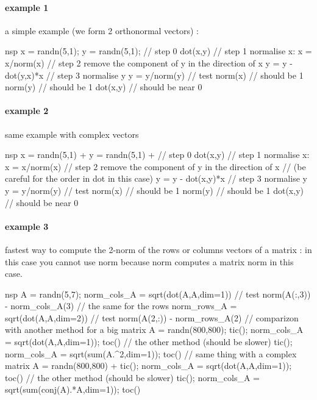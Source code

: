 \begin{examples}
\paragraph{example 1} a simple example (we form 2 orthonormal vectors) :
\begin{mintednsp}{nsp}
x = randn(5,1);
y = randn(5,1);
// step 0
dot(x,y)
// step 1 normalise x:
x = x/norm(x)
// step 2 remove the component of y in the direction of x
y = y - dot(y,x)*x
// step 3 normalise y
y = y/norm(y)
// test 
norm(x)  // should be 1
norm(y)  // should be 1
dot(x,y) // should be near 0
\end{mintednsp}

\paragraph{example 2} same example with complex vectors
\begin{mintednsp}{nsp}
x = randn(5,1) + %
y = randn(5,1) + %
// step 0
dot(x,y)
// step 1 normalise x:
x = x/norm(x)
// step 2 remove the component of y in the direction of x
// (be careful for the order in dot in this case)
y = y - dot(x,y)*x
// step 3 normalise y
y = y/norm(y)
// test 
norm(x)  // should be 1
norm(y)  // should be 1
dot(x,y) // should be near 0
\end{mintednsp}

\paragraph{example 3} fastest way to compute the 2-norm of the rows or
 columns vectors of a matrix : in this case you cannot use norm because
 norm computes a matrix norm in this case.
\begin{mintednsp}{nsp}
A = randn(5,7);
norm_cols_A = sqrt(dot(A,A,dim=1))
// test
norm(A(:,3)) - norm_cols_A(3)
// the same for the rows
norm_rows_A = sqrt(dot(A,A,dim=2))
// test
norm(A(2,:)) - norm_rows_A(2)
// comparizon with another method for a big matrix
A = randn(800,800);
tic(); norm_cols_A = sqrt(dot(A,A,dim=1)); toc()
// the other method (should be slower)
tic(); norm_cols_A = sqrt(sum(A.^2,dim=1)); toc()
// same thing with a complex matrix
A = randn(800,800) + %
tic(); norm_cols_A = sqrt(dot(A,A,dim=1)); toc()
// the other method (should be slower)
tic(); norm_cols_A = sqrt(sum(conj(A).*A,dim=1)); toc()
\end{mintednsp}
\end{examples}

\begin{manseealso}
     
\end{manseealso}


